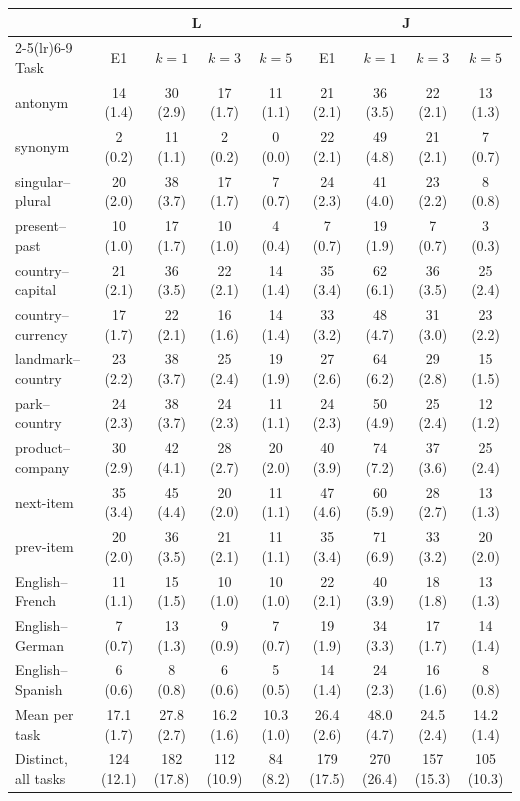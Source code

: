 \begin{tabular}{@{}lcccccccc@{}}
\toprule
 & \multicolumn{4}{c}{L} & \multicolumn{4}{c}{J} \\
\cmidrule(lr){2-5}\cmidrule(lr){6-9}
Task & E1 & $k=1$ & $k=3$ & $k=5$ & E1 & $k=1$ & $k=3$ & $k=5$ \\
\midrule
antonym & 14 (1.4) & 30 (2.9) & 17 (1.7) & 11 (1.1) & 21 (2.1) & 36 (3.5) & 22 (2.1) & 13 (1.3) \\
synonym & 2 (0.2) & 11 (1.1) & 2 (0.2) & 0 (0.0) & 22 (2.1) & 49 (4.8) & 21 (2.1) & 7 (0.7) \\
singular--plural & 20 (2.0) & 38 (3.7) & 17 (1.7) & 7 (0.7) & 24 (2.3) & 41 (4.0) & 23 (2.2) & 8 (0.8) \\
present--past & 10 (1.0) & 17 (1.7) & 10 (1.0) & 4 (0.4) & 7 (0.7) & 19 (1.9) & 7 (0.7) & 3 (0.3) \\
country--capital & 21 (2.1) & 36 (3.5) & 22 (2.1) & 14 (1.4) & 35 (3.4) & 62 (6.1) & 36 (3.5) & 25 (2.4) \\
country--currency & 17 (1.7) & 22 (2.1) & 16 (1.6) & 14 (1.4) & 33 (3.2) & 48 (4.7) & 31 (3.0) & 23 (2.2) \\
landmark--country & 23 (2.2) & 38 (3.7) & 25 (2.4) & 19 (1.9) & 27 (2.6) & 64 (6.2) & 29 (2.8) & 15 (1.5) \\
park--country & 24 (2.3) & 38 (3.7) & 24 (2.3) & 11 (1.1) & 24 (2.3) & 50 (4.9) & 25 (2.4) & 12 (1.2) \\
product--company & 30 (2.9) & 42 (4.1) & 28 (2.7) & 20 (2.0) & 40 (3.9) & 74 (7.2) & 37 (3.6) & 25 (2.4) \\
next-item & 35 (3.4) & 45 (4.4) & 20 (2.0) & 11 (1.1) & 47 (4.6) & 60 (5.9) & 28 (2.7) & 13 (1.3) \\
prev-item & 20 (2.0) & 36 (3.5) & 21 (2.1) & 11 (1.1) & 35 (3.4) & 71 (6.9) & 33 (3.2) & 20 (2.0) \\
English--French & 11 (1.1) & 15 (1.5) & 10 (1.0) & 10 (1.0) & 22 (2.1) & 40 (3.9) & 18 (1.8) & 13 (1.3) \\
English--German & 7 (0.7) & 13 (1.3) & 9 (0.9) & 7 (0.7) & 19 (1.9) & 34 (3.3) & 17 (1.7) & 14 (1.4) \\
English--Spanish & 6 (0.6) & 8 (0.8) & 6 (0.6) & 5 (0.5) & 14 (1.4) & 24 (2.3) & 16 (1.6) & 8 (0.8) \\
\midrule
Mean per task & 17.1 (1.7) & 27.8 (2.7) & 16.2 (1.6) & 10.3 (1.0) & 26.4 (2.6) & 48.0 (4.7) & 24.5 (2.4) & 14.2 (1.4) \\
Distinct, all tasks & 124 (12.1) & 182 (17.8) & 112 (10.9) & 84 (8.2) & 179 (17.5) & 270 (26.4) & 157 (15.3) & 105 (10.3) \\
\bottomrule
\end{tabular}
